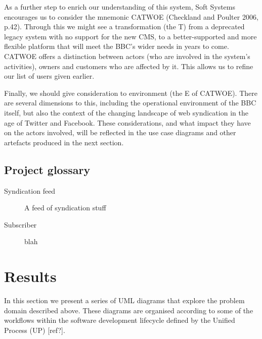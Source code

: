 \documentclass{article}
\begin{document}
As a further step to enrich our understanding of this system, Soft Systems encourages us to consider the mnemonic CATWOE (Checkland and Poulter 2006, p.42). Through this we might see a transformation (the T) from a deprecated legacy system with no support for the new CMS, to a better-supported and more flexible platform that will meet the BBC's wider needs in years to come. CATWOE offers a distinction between actors (who are involved in the system's activities), owners and customers who are affected by it. This allows us to refine our list of users given earlier.

Finally, we should give consideration to environment (the E of CATWOE). There are several dimensions to this, including the operational environment of the BBC itself, but also the context of the changing landscape of web syndication in the age of Twitter and Facebook. These considerations, and what impact they have on the actors involved, will be reflected in the use case diagrams and other artefacts produced in the next section.




\subsection{Project glossary}

\begin{description}

\item [Syndication feed]
A feed of syndication stuff

\item [Subscriber]
blah

\end{description}

\section{Results}

In this section we present a series of UML diagrams that explore the problem domain described above. These diagrams are organised according to some of the workflows within the software development lifecycle defined by the Unified Process (UP) [ref?].
\end{document}
